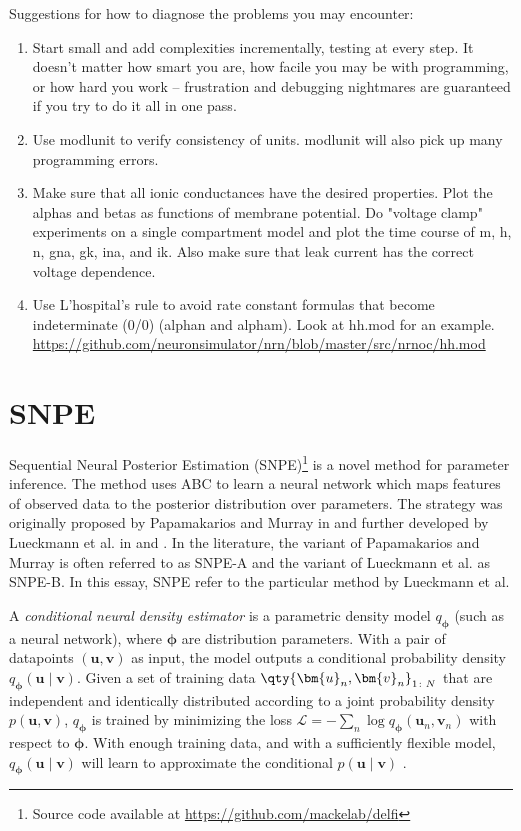 Suggestions for how to diagnose the problems you may encounter:

\begin{enumerate}
    \item Start small and add complexities incrementally, testing at every step. It doesn't matter how smart you are, how facile you may be with programming, or how hard you work -- frustration and debugging nightmares are guaranteed if you try to do it all in one pass.
    \item Use modlunit to verify consistency of units. modlunit will also pick up many programming errors.
    \item Make sure that all ionic conductances have the desired properties. Plot the alphas and betas as functions of membrane potential. Do "voltage clamp" experiments on a single compartment model and plot the time course of m, h, n, gna, gk, ina, and ik. Also make sure that leak current has the correct voltage dependence.
    \item Use L'hospital's rule to avoid rate constant formulas that become indeterminate (0/0) (alphan and alpham). Look at hh.mod for an example. \url{https://github.com/neuronsimulator/nrn/blob/master/src/nrnoc/hh.mod}
\end{enumerate}

\section{SNPE}

Sequential Neural Posterior Estimation (SNPE)\footnote{Source code available at \url{https://github.com/mackelab/delfi}} is a novel method for parameter inference. The method uses ABC to learn a neural network which maps features of observed data to the posterior distribution over parameters. The strategy was originally proposed by Papamakarios and Murray in \cite{papamakarios2016fast} and further developed by Lueckmann et al. in \cite{SNPE17} and \cite{SNPE19}. In the literature, the variant of Papamakarios and Murray is often referred to as SNPE-A and the variant of Lueckmann et al. as SNPE-B. In this essay, SNPE refer to the particular method by Lueckmann et al.

A \textit{conditional neural density estimator} is a parametric density model $q_{\bm{\phi}}$ (such as a neural network), where $\bm{\phi}$ are distribution parameters. With a pair of datapoints $(\bm{u}, \bm{v})$ as input, the model outputs a conditional probability density $q_{\bm{\phi}}(\bm{u}\mid \bm{v})$. Given a set of training data $\qty{\bm{u}_n, \bm{v}_n}_{1\colon N}$ that are independent and identically distributed according to a joint probability density $p(\bm{u}, \bm{v})$, $q_{\bm{\phi}}$ is trained by minimizing the loss $\mathcal{L} = - \sum_n \log q_{\bm{\phi}}(\bm{u}_n, \bm{v}_n)$ with respect to $\bm{\phi}$. With enough training data, and with a sufficiently flexible model, $q_{\bm{\phi}}(\bm{u}\mid \bm{v})$ will learn to approximate the conditional $p(\bm{u}\mid \bm{v})$ \cite{SNL18}. 

